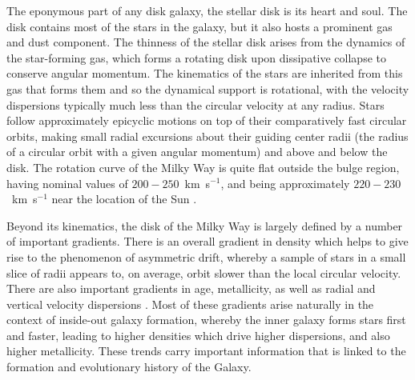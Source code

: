 The eponymous part of any disk galaxy, the stellar disk is its heart and soul. The disk contains most of the stars in the galaxy, but it also hosts a prominent gas and dust component. The thinness of the stellar disk arises from the dynamics of the star-forming gas, which forms a rotating disk upon dissipative collapse to conserve angular momentum. The kinematics of the stars are inherited from this gas that forms them and so the dynamical support is rotational, with the velocity dispersions typically much less than the circular velocity at any radius. Stars follow approximately epicyclic motions on top of their comparatively fast circular orbits, making small radial excursions about their guiding center radii (the radius of a circular orbit with a given angular momentum) and above and below the disk. The rotation curve of the Milky Way is quite flat outside the bulge region, having nominal values of $200-250$~km~s$^{-1}$, and being approximately $220-230$~km~s$^{-1}$ near the location of the Sun \parencite[e.g.][]{bovy12a,eilers19}.

Beyond its kinematics, the disk of the Milky Way is largely defined by a number of important gradients. There is an overall gradient in density \parencite[equivalently luminosity, as in other galaxies per e.g.][]{freeman70} which helps to give rise to the phenomenon of asymmetric drift, whereby a sample of stars in a small slice of radii appears to, on average, orbit slower than the local circular velocity. There are also important gradients in age, metallicity, as well as radial and vertical velocity dispersions \parencite[e.g.][]{bovy12d,bovy16b,mackereth19a}. Most of these gradients arise naturally in the context of inside-out galaxy formation, whereby the inner galaxy forms stars first and faster, leading to higher densities which drive higher dispersions, and also higher metallicity. These trends carry important information that is linked to the formation and evolutionary history of the Galaxy.

